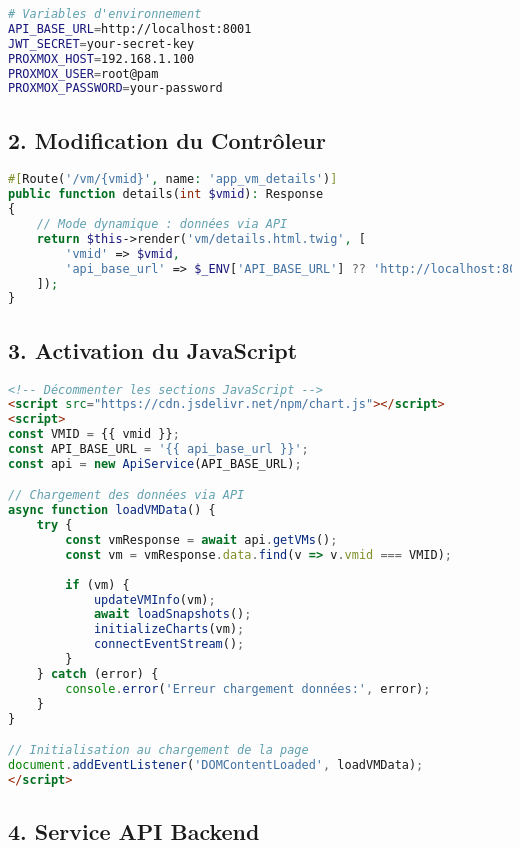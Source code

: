 \documentclass[12pt,a4paper]{report}
\begin{document}
\begin{lstlisting}[language=bash, caption=Configuration environnement]
# Variables d'environnement
API_BASE_URL=http://localhost:8001
JWT_SECRET=your-secret-key
PROXMOX_HOST=192.168.1.100
PROXMOX_USER=root@pam
PROXMOX_PASSWORD=your-password
\end{lstlisting}

\subsection{2. Modification du Contrôleur}

\begin{lstlisting}[language=PHP, caption=Contrôleur en mode dynamique]
#[Route('/vm/{vmid}', name: 'app_vm_details')]
public function details(int $vmid): Response
{
    // Mode dynamique : données via API
    return $this->render('vm/details.html.twig', [
        'vmid' => $vmid,
        'api_base_url' => $_ENV['API_BASE_URL'] ?? 'http://localhost:8001',
    ]);
}
\end{lstlisting}

\subsection{3. Activation du JavaScript}

\begin{lstlisting}[language=HTML, caption=Template en mode dynamique]
<!-- Décommenter les sections JavaScript -->
<script src="https://cdn.jsdelivr.net/npm/chart.js"></script>
<script>
const VMID = {{ vmid }};
const API_BASE_URL = '{{ api_base_url }}';
const api = new ApiService(API_BASE_URL);

// Chargement des données via API
async function loadVMData() {
    try {
        const vmResponse = await api.getVMs();
        const vm = vmResponse.data.find(v => v.vmid === VMID);
        
        if (vm) {
            updateVMInfo(vm);
            await loadSnapshots();
            initializeCharts(vm);
            connectEventStream();
        }
    } catch (error) {
        console.error('Erreur chargement données:', error);
    }
}

// Initialisation au chargement de la page
document.addEventListener('DOMContentLoaded', loadVMData);
</script>
\end{lstlisting}

\subsection{4. Service API Backend}
\end{document}
